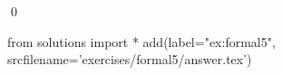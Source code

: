 
\begin{ex} 
  \label{ex:formal5}
  
  \qed
\end{ex} 
\begin{python0}
from solutions import *
add(label="ex:formal5",
    srcfilename='exercises/formal5/answer.tex') 
\end{python0}
